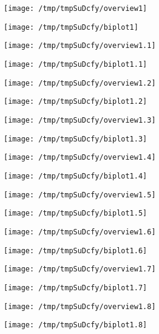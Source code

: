 \documentclass{article}
\begin{document}

\centerline{\texttt{[image: /tmp/tmpSuDcfy/overview1]}}

\centerline{\texttt{[image: /tmp/tmpSuDcfy/biplot1]}}

\clearpage\centerline{\texttt{[image: /tmp/tmpSuDcfy/overview1.1]}}

\centerline{\texttt{[image: /tmp/tmpSuDcfy/biplot1.1]}}

\clearpage\centerline{\texttt{[image: /tmp/tmpSuDcfy/overview1.2]}}

\centerline{\texttt{[image: /tmp/tmpSuDcfy/biplot1.2]}}

\clearpage\centerline{\texttt{[image: /tmp/tmpSuDcfy/overview1.3]}}

\centerline{\texttt{[image: /tmp/tmpSuDcfy/biplot1.3]}}

\clearpage\centerline{\texttt{[image: /tmp/tmpSuDcfy/overview1.4]}}

\centerline{\texttt{[image: /tmp/tmpSuDcfy/biplot1.4]}}

\clearpage\centerline{\texttt{[image: /tmp/tmpSuDcfy/overview1.5]}}

\centerline{\texttt{[image: /tmp/tmpSuDcfy/biplot1.5]}}

\clearpage\centerline{\texttt{[image: /tmp/tmpSuDcfy/overview1.6]}}

\centerline{\texttt{[image: /tmp/tmpSuDcfy/biplot1.6]}}

\clearpage\centerline{\texttt{[image: /tmp/tmpSuDcfy/overview1.7]}}

\centerline{\texttt{[image: /tmp/tmpSuDcfy/biplot1.7]}}

\clearpage\centerline{\texttt{[image: /tmp/tmpSuDcfy/overview1.8]}}

\centerline{\texttt{[image: /tmp/tmpSuDcfy/biplot1.8]}}
\end{document}
